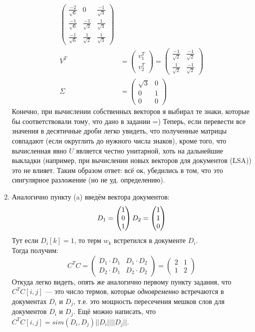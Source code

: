 \begin{solution}
\begin{enumerate}
\begin{align*}
\begin{pmatrix}
	\frac{-2}{\sqrt{6}} & 0 & \frac{-1}{\sqrt{3}} \\
	\frac{-1}{\sqrt{6}} & \frac{-1}{\sqrt{2}} & \frac{1}{\sqrt{3}} \\
	\frac{-1}{\sqrt{6}} & \frac{1}{\sqrt{2}} & \frac{1}{\sqrt{3}}
	\end{pmatrix} \\
	V^T &=
	\begin{pmatrix}
	v_1^T \\
	v_2^T 
	\end{pmatrix}
	=
	\begin{pmatrix}
	\frac{-1}{\sqrt{2}} & \frac{-1}{\sqrt{2}} \\
	\frac{1}{\sqrt{2}} & \frac{-1}{\sqrt{2}}
	\end{pmatrix} \\
	\Sigma &= 
	\begin{pmatrix}
		\sqrt{3} & 0 \\
		0 & 1 \\
		0 & 0
	\end{pmatrix}
	\end{align*}
	Конечно, при вычислении собственных векторов я выбирал те знаки, которые бы соответствовали тому, что дано в задании =)
	Теперь, если перевести все значения в десятичные дроби легко увидеть, что полученные матрицы совпадают (если округлить до нужного числа знаков), кроме того, что вычисленная явно $U$ является честно унитарной, хоть на дальнейшие выкладки (например, при вычислении новых векторов для документов (LSA)) это не влияет. Таким образом ответ: всё ок, убедились в том, что это сингулярное разложение (но не уд. определению).

	\item Аналогично пункту (a) введём вектора документов:
	\begin{align*}
	D_1 = \begin{pmatrix}1 \\ 0 \\ 1\end{pmatrix}
	D_2 = \begin{pmatrix}1 \\ 1 \\ 0\end{pmatrix}
	\end{align*}
	Тут если $D_i[k] = 1$, то терм $w_k$ встретился в документе $D_i$.\\
	Тогда получим:
	\begin{equation*}
	C^TC =
	\begin{pmatrix}
	D_1 \cdot D_1 & D_1 \cdot D_2 \\
	D_2 \cdot D_1 & D_2 \cdot D_2
	\end{pmatrix}
	=
	\begin{pmatrix}
	2 & 1 \\
	1 & 2 
	\end{pmatrix}
	\end{equation*}
	Откуда легко видеть, опять же аналогично первому пункту задания, что $C^TC[i, j]$ --- это число термов, которые \emph{одновременно} встречаются в документах $D_i$ и $D_j$, т.е. это мощность пересечения мешков слов для документов $D_i$ и $D_j$. Ещё можно написать, что $C^TC[i, j] = sim(D_i, D_j) ||D_i|| ||D_j||$.
\end{enumerate}
\end{solution}

